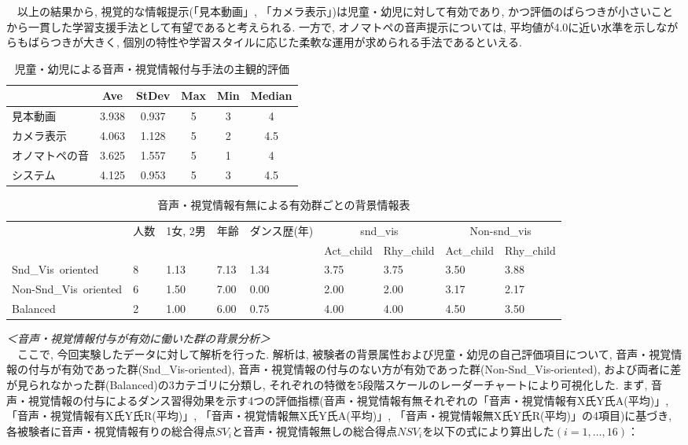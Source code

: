 \documentclass[technicalreport]{ieicej}
\begin{document}
　以上の結果から, 視覚的な情報提示(「見本動画」, 「カメラ表示」)は児童・幼児に対して有効であり, かつ評価のばらつきが小さいことから一貫した学習支援手法として有望であると考えられる. 一方で, オノマトペの音声提示については, 平均値が4.0に近い水準を示しながらもばらつきが大きく, 個別の特性や学習スタイルに応じた柔軟な運用が求められる手法であるといえる. \\
\begin{table}[t]
  \centering
  \caption{児童・幼児による音声・視覚情報付与手法の主観的評価}
  \begin{tabularx}{\linewidth}{X c c c c c}
    \toprule
      & Ave & StDev & Max & Min & Median \\
    \midrule
      見本動画 & 3.938 & 0.937 & 5 & 3 & 4 \\
      カメラ表示 & 4.063 & 1.128 & 5 & 2 & 4.5 \\
      オノマトペの音 & 3.625 & 1.557 & 5 & 1 & 4 \\
      システム & 4.125 & 0.953 & 5 & 3 & 4.5 \\
    \bottomrule
  \end{tabularx}
\end{table}
\begin{table}[t]
  \centering
  \caption{音声・視覚情報有無による有効群ごとの背景情報表}
  \begin{tabularx}{\textwidth}{>{\raggedright}X *{8}{X}} %
    \toprule
      & 人数 & 1女, 2男 & 年齢 & ダンス歴(年) 
      & \multicolumn{2}{c}{snd\_vis} 
      & \multicolumn{2}{c}{Non-snd\_vis} \\
      \cmidrule(lr){6-7} \cmidrule(lr){8-9}
      &     &     &     &     
      & Act\_child & Rhy\_child & Act\_child & Rhy\_child \\
    \midrule
      \hbox{Snd\_Vis oriented} & 8 & 1.13 & 7.13 & 1.34 & 3.75 & 3.75 & 3.50 & 3.88 \\
      \hbox{Non-Snd\_Vis oriented} & 6 & 1.50 & 7.00 & 0.00 & 2.00 & 2.00 & 3.17 & 2.17 \\
      \hbox{Balanced} & 2 & 1.00 & 6.00 & 0.75 & 4.00 & 4.00 & 4.50 & 3.50 \\
    \bottomrule
  \end{tabularx}
\end{table}
\textit{＜音声・視覚情報付与が有効に働いた群の背景分析＞}\\
　ここで, 今回実験したデータに対して解析を行った. 解析は, 被験者の背景属性および児童・幼児の自己評価項目について, 音声・視覚情報の付与が有効であった群(Snd\_Vis-oriented), 音声・視覚情報の付与のない方が有効であった群(Non-Snd\_Vis-oriented), および両者に差が見られなかった群(Balanced)の3カテゴリに分類し, それぞれの特徴を5段階スケールのレーダーチャートにより可視化した. まず, 音声・視覚情報の付与によるダンス習得効果を示す4つの評価指標(音声・視覚情報有無それぞれの「音声・視覚情報有X氏Y氏A(平均)」, 「音声・視覚情報有X氏Y氏R(平均)」, 「音声・視覚情報無X氏Y氏A(平均)」, 「音声・視覚情報無X氏Y氏R(平均)」の4項目)に基づき, 各被験者に音声・視覚情報有りの総合得点$SV_{i}$と音声・視覚情報無しの総合得点$NSV_{i}$を以下の式により算出した$(i=1,\dots,16)$：
\end{document}
